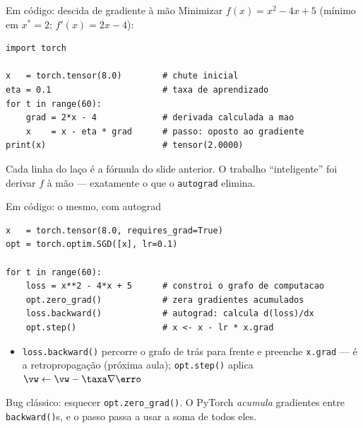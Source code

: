 \documentclass[aspectratio=169, 11pt]{beamer}
\begin{document}
\begin{frame}[fragile]{Em código: descida de gradiente à mão}
  Minimizar $f(x) = x^2 - 4x + 5$ (mínimo em $x^* = 2$; $f'(x) = 2x - 4$):

\begin{lstlisting}
import torch

x   = torch.tensor(8.0)        # chute inicial
eta = 0.1                      # taxa de aprendizado
for t in range(60):
    grad = 2*x - 4             # derivada calculada a mao
    x    = x - eta * grad      # passo: oposto ao gradiente
print(x)                       # tensor(2.0000)
\end{lstlisting}

  \begin{ideiabox}
    Cada linha do laço é a fórmula do slide anterior. O trabalho
    ``inteligente'' foi derivar $f$ à mão — exatamente o que o
    \texttt{autograd} elimina.
  \end{ideiabox}
\end{frame}

\begin{frame}[fragile]{Em código: o mesmo, com autograd}
\begin{lstlisting}
x   = torch.tensor(8.0, requires_grad=True)
opt = torch.optim.SGD([x], lr=0.1)

for t in range(60):
    loss = x**2 - 4*x + 5      # constroi o grafo de computacao
    opt.zero_grad()            # zera gradientes acumulados
    loss.backward()            # autograd: calcula d(loss)/dx
    opt.step()                 # x <- x - lr * x.grad
\end{lstlisting}

  \begin{itemize}\setlength{\itemsep}{0.2ex}
    \item \texttt{loss.backward()} percorre o grafo de trás para frente e
          preenche \texttt{x.grad} — é a \alert{retropropagação} (próxima aula);
          \texttt{opt.step()} aplica $\vw \leftarrow \vw - \taxa \nabla \erro$
  \end{itemize}

  \begin{alertabox}
    Bug clássico: esquecer \texttt{opt.zero\_grad()}. O PyTorch \emph{acumula}
    gradientes entre \texttt{backward()}s, e o passo passa a usar a soma de
    todos eles.
  \end{alertabox}
\end{frame}
\end{document}
